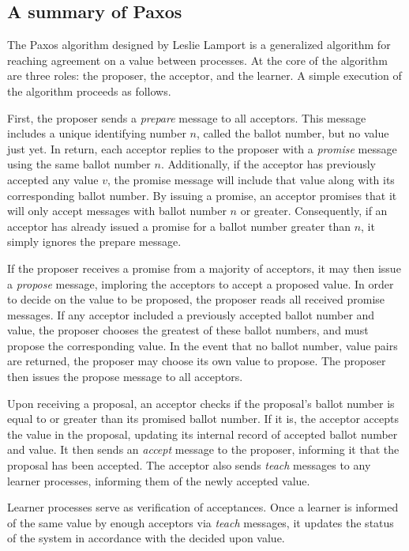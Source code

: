 \documentclass[12pt]{article}
\begin{document}
\subsection{A summary of Paxos}
The Paxos algorithm designed by Leslie Lamport is a generalized algorithm
for reaching agreement on a value between processes.
At the core of the algorithm are three roles: the proposer, the acceptor,
and the learner. A simple execution of the algorithm proceeds as follows.

First, the proposer sends a \textit{prepare} message to all acceptors.
This message includes a unique identifying number $n$, called the ballot
number, but no value just yet.
In return, each acceptor replies to the proposer with a \textit{promise}
message using the same ballot number $n$. Additionally, if the acceptor
has previously accepted any value $v$, the promise message will include
that value along with its corresponding ballot number.
By issuing a promise, an acceptor promises that it will only accept messages
with ballot number $n$ or greater. Consequently, if an acceptor has already issued a
promise for a ballot number greater than $n$, it simply ignores the prepare message.

If the proposer receives a promise from a majority of acceptors, it may then issue
a \textit{propose} message, imploring the acceptors to accept a proposed value.
In order to decide on the value to be proposed, the proposer reads all received
promise messages. If any acceptor included a previously accepted ballot number
and value, the proposer chooses the greatest of these
ballot numbers, and must propose the corresponding value. In the event that
no ballot number, value pairs are returned, the proposer may choose its own
value to propose. The proposer then issues the propose message to all acceptors.

Upon receiving a proposal, an acceptor checks if the proposal's ballot number
is equal to or greater than its promised ballot number. If it is,
the acceptor accepts the value in the proposal, updating its internal
record of accepted ballot number and value. It then sends an \textit{accept} message
to the proposer, informing it that the proposal has been accepted.
The acceptor also sends \textit{teach} messages to any learner processes,
informing them of the newly accepted value.

Learner processes serve as verification of acceptances. Once a learner is informed
of the same value by enough acceptors via \textit{teach} messages, it updates
the status of the system in accordance with the decided upon value.
\end{document}
